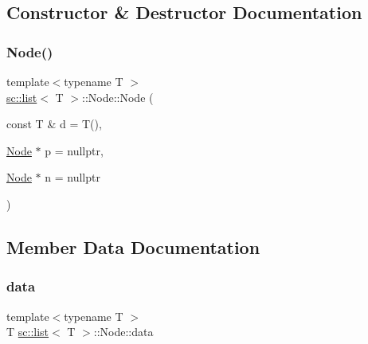 \subsection{Constructor \& Destructor Documentation}
\mbox{\label{structsc_1_1list_1_1_node_a43b4121e99bd75c88f2925e6487976af}} 
\subsubsection{\texorpdfstring{Node()}{Node()}}
{\footnotesize\ttfamily template$<$typename T $>$ \\
\hyperlink{classsc_1_1list}{sc\+::list}$<$ T $>$\+::Node\+::\+Node (\begin{DoxyParamCaption}\item[{const T \&}]{d = {\ttfamily T()},  }\item[{\hyperlink{structsc_1_1list_1_1_node}{Node} $\ast$}]{p = {\ttfamily nullptr},  }\item[{\hyperlink{structsc_1_1list_1_1_node}{Node} $\ast$}]{n = {\ttfamily nullptr} }\end{DoxyParamCaption})\hspace{0.3cm}{\ttfamily [inline]}}



\subsection{Member Data Documentation}
\mbox{\label{structsc_1_1list_1_1_node_a77a35a24ed39572cf696d53be6c5ec90}} 
\subsubsection{\texorpdfstring{data}{data}}
{\footnotesize\ttfamily template$<$typename T $>$ \\
T \hyperlink{classsc_1_1list}{sc\+::list}$<$ T $>$\+::Node\+::data}

\mbox{\label{structsc_1_1list_1_1_node_aaa401ec4c4ca551180062524f1952230}} 
